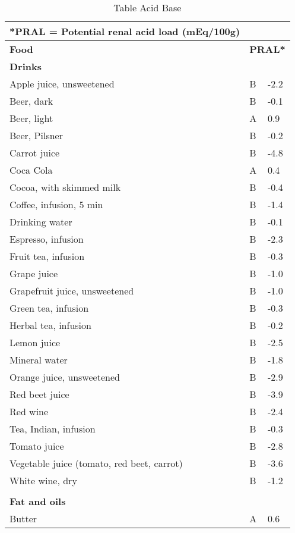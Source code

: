 \documentclass[../main.tex]{subfiles}
\begin{document}

\clearpage
\thispagestyle{empty}
  \centering 
\begin{longtable}{p{7cm}p{0.5cm}p{1cm}}
  \caption{Table Acid Base}\\
\footnotesize{*PRAL = Potential renal acid load (mEq/100g)}  \\
\toprule
    \textbf{Food}  &  \multicolumn{2}{l}{\textbf{PRAL*}}  \\
    \midrule
    \endhead
\multicolumn{3}{l}{\textbf{Drinks}}  \\
Apple juice, unsweetened   & B   & -2.2 \\
Beer, dark   & B   & -0.1 \\
Beer, light   & A   & 0.9 \\
Beer, Pilsner   & B   & -0.2 \\
Carrot juice  & B   & -4.8 \\
Coca Cola   & A   & 0.4 \\
Cocoa, with skimmed milk  & B   & -0.4 \\
Coffee, infusion, 5 min   & B   & -1.4 \\
Drinking water  & B   & -0.1 \\
Espresso, infusion   & B   & -2.3 \\
Fruit tea, infusion   & B  & -0.3 \\
Grape juice  & B   & -1.0 \\
Grapefruit juice, unsweetened   & B   & -1.0 \\
Green tea, infusion   & B   & -0.3 \\
Herbal tea, infusion   & B   & -0.2 \\
Lemon juice  & B   & -2.5 \\
Mineral water  & B   & -1.8 \\
Orange juice, unsweetened  & B   & -2.9 \\
Red beet juice  & B   & -3.9 \\
Red wine  & B   & -2.4 \\
Tea, Indian, infusion  & B   & -0.3 \\
Tomato juice  & B   & -2.8 \\
Vegetable juice (tomato, red beet, carrot)   & B   & -3.6 \\
White wine, dry  & B   & -1.2 \\
 \\
\multicolumn{3}{l}{\textbf{Fat and oils}}  \\
Butter  & A   & 0.6 \\

\end{longtable}
\end{document}
